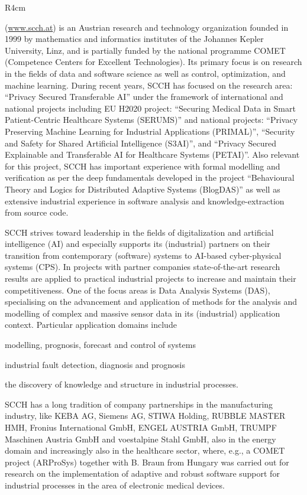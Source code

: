 \documentclass[a4paper,11pt]{article}
\begin{document}
\begin{wrapfigure}{R}{4cm}
\vspace{-2cm}
\hfill {}
\vspace{-1cm}
\end{wrapfigure}

\SCCH{} (\url{www.scch.at}) is an Austrian research and technology organization founded in 1999 by mathematics and informatics institutes of the Johannes Kepler University, Linz, and is partially funded by the national programme COMET (Competence Centers for Excellent Technologies). Its primary focus is on research in the fields of data and software science as well as control, optimization, and machine learning. During recent years, SCCH has focused on the research area: ``Privacy Secured Transferable AI'' under the framework of international and national projects including EU H2020 project: ``Securing Medical Data in Smart Patient-Centric Healthcare Systems (SERUMS)'' and national projects: ``Privacy Preserving Machine Learning for Industrial Applications (PRIMAL)'', ``Security and Safety for Shared Artificial Intelligence (S3AI)'', and ``Privacy Secured Explainable and Transferable AI for Healthcare Systems (PETAI)''. Also relevant for this project, SCCH has important experience with formal modelling and verification as per the deep fundamentals developed in the project ``Behavioural Theory and Logics for Distributed Adaptive Systems (BlogDAS)'' as well as extensive industrial experience in software analysis and knowledge-extraction from source code. 

SCCH strives toward leadership in the fields of digitalization and artificial intelligence (AI) and especially supports its (industrial) partners on their transition from contemporary (software) systems to AI-based cyber-physical systems (CPS). In projects with partner companies state-of-the-art research results are applied to practical industrial projects to increase and maintain their competitiveness. One of the focus areas is Data Analysis Systems (DAS), specialising on the advancement and application of methods for the analysis and modelling of complex and massive sensor data in its (industrial) application context. Particular application domains include
\begin{inparaenum}[a)]
\item modelling, prognosis, forecast and control of systems
\item industrial fault detection, diagnosis and prognosis
\item the discovery of knowledge and structure in industrial processes.
\end{inparaenum}
SCCH has a long tradition of company partnerships in the manufacturing industry, like KEBA AG, Siemens AG, STIWA Holding, RUBBLE MASTER HMH, Fronius International GmbH, ENGEL AUSTRIA GmbH, TRUMPF Maschinen Austria GmbH and voestalpine Stahl GmbH, also in the energy domain and increasingly also in the healthcare sector, where, e.g., a COMET project (ARProSys) together with B. Braun from Hungary was carried out for research on the implementation of adaptive and robust software support for industrial processes in the area of electronic medical devices. 
\end{document}
